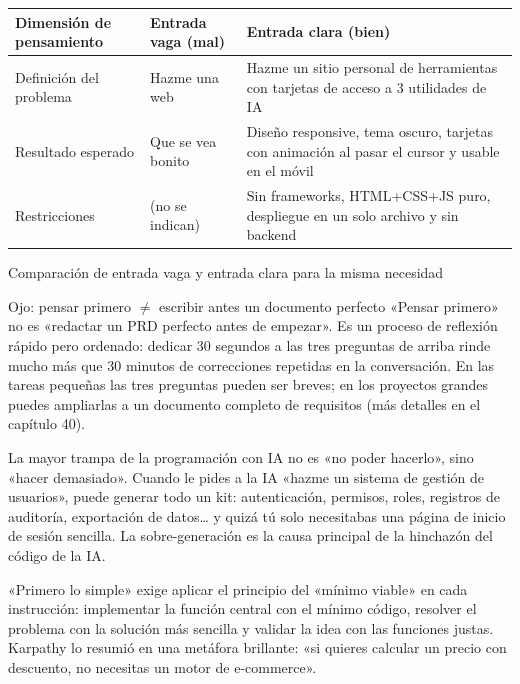 \begin{center}
\begin{tabularx}{\linewidth}{|X|X|X|}
\hline
\textbf{Dimensión de pensamiento} & \textbf{Entrada vaga (mal)} & \textbf{Entrada clara (bien)} \tabularnewline
\hline
Definición del problema & Hazme una web & Hazme un sitio personal de herramientas con tarjetas de acceso a 3 utilidades de IA \tabularnewline
Resultado esperado & Que se vea bonito & Diseño responsive, tema oscuro, tarjetas con animación al pasar el cursor y usable en el móvil \tabularnewline
Restricciones & (no se indican) & Sin frameworks, HTML+CSS+JS puro, despliegue en un solo archivo y sin backend \tabularnewline
\hline
\end{tabularx}
\end{center}

\begin{center}\small\color{gray}Comparación de entrada vaga y entrada clara para la misma necesidad\end{center}

\begin{tcbwarn}{Ojo: pensar primero $\neq$ escribir antes un documento perfecto}
«Pensar primero» no es «redactar un PRD perfecto antes de empezar». Es un proceso de reflexión rápido pero ordenado: dedicar 30 segundos a las tres preguntas de arriba rinde mucho más que 30 minutos de correcciones repetidas en la conversación. En las tareas pequeñas las tres preguntas pueden ser breves; en los proyectos grandes puedes ampliarlas a un documento completo de requisitos (más detalles en el capítulo 40).

\end{tcbwarn}


La mayor trampa de la programación con IA no es «no poder hacerlo», sino «hacer demasiado». Cuando le pides a la IA «hazme un sistema de gestión de usuarios», puede generar todo un kit: autenticación, permisos, roles, registros de auditoría, exportación de datos… y quizá tú solo necesitabas una página de inicio de sesión sencilla. La sobre-generación es la causa principal de la hinchazón del código de la IA.

«Primero lo simple» exige aplicar el principio del «mínimo viable» en cada instrucción: implementar la función central con el mínimo código, resolver el problema con la solución más sencilla y validar la idea con las funciones justas. Karpathy lo resumió en una metáfora brillante: «si quieres calcular un precio con descuento, no necesitas un motor de e-commerce».

